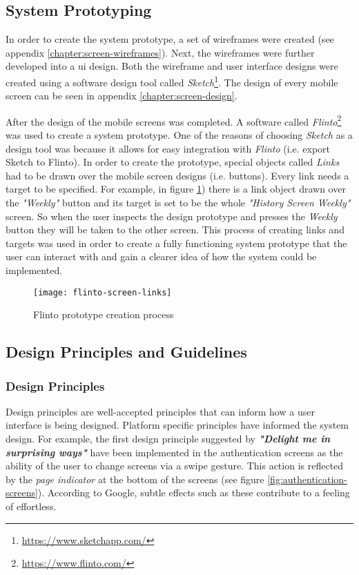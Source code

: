         \subsection{System Prototyping}
        In order to create the system prototype, a set of wireframes were created (see appendix \ref{chapter:screen-wireframes}). Next, the wireframes were further developed into a \gls{ui} design. Both the wireframe and user interface designs were created using a software design tool called \textit{Sketch}\footnote{\url{https://www.sketchapp.com/}}. The design of every mobile screen can be seen in appendix \ref{chapter:screen-design}. 
        
        After the design of the mobile screens was completed. A software called \textit{Flinto}\footnote{\url{https://www.flinto.com/}} was used to create a system prototype. One of the reasons of choosing \textit{Sketch} as a design tool was because it allows for easy integration with \textit{Flinto} (i.e. export Sketch to Flinto). In order to create the prototype, special objects called \textit{Links} had to be drawn over the mobile screen designs (i.e. buttons). Every link needs a target to be specified. For example, in figure \ref{fig:flinto_prototype}) there is a link object drawn over the \textit{"Weekly"} button and its target is set to be the whole \textit{"History Screen Weekly"} screen. So when the user inspects the design prototype and presses the \textit{Weekly} button they will be taken to the other screen. This process of creating links and targets was used in order to create a fully functioning system prototype that the user can interact with and gain a clearer idea of how the system could be implemented.
        
        \begin{figure}[ht]
            \centering
            \texttt{[image: flinto-screen-links]}
            \caption{Flinto prototype creation process}
            \label{fig:flinto_prototype}
        \end{figure}
        
        
        \subsection{Design Principles and Guidelines}
        
        \subsubsection{Design Principles}
        Design principles are well-accepted principles that can inform how a user interface is being designed. Platform specific principles have informed the system design. For example, the first design principle suggested by \citet{google2017b} \textbf{\textit{"Delight me in surprising ways"}} have been implemented in the authentication screens as the ability of the user to change screens via a swipe gesture. This action is reflected by the \textit{page indicator} at the bottom of the screens (see figure \ref{fig:authentication-screens}). According to Google, subtle effects such as these contribute to a feeling of effortless. 
        
